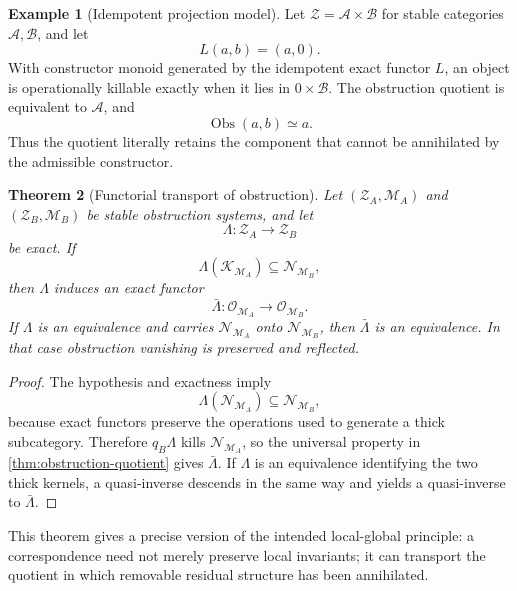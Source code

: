 \documentclass[11pt]{article}
\newtheorem{theorem}{Theorem}[section]
\theoremstyle{definition}
\newtheorem{example}[theorem]{Example}
\theoremstyle{remark}
\newcommand{\Obs}{\operatorname{Obs}}
\begin{document}
\begin{example}[Idempotent projection model]
Let $\mathcal Z=\mathcal A\times\mathcal B$ for stable categories $\mathcal A,\mathcal B$, and let
\[
L(a,b)=(a,0).
\]
With constructor monoid generated by the idempotent exact functor $L$, an object is operationally killable exactly when it lies in $0\times\mathcal B$. The obstruction quotient is equivalent to $\mathcal A$, and
\[
\Obs(a,b)\simeq a.
\]
Thus the quotient literally retains the component that cannot be annihilated by the admissible constructor.
\end{example}

\begin{theorem}[Functorial transport of obstruction]\label{thm:obstruction-transport}
Let $(\mathcal Z_A,\mathscr M_A)$ and $(\mathcal Z_B,\mathscr M_B)$ be stable obstruction systems, and let
\[
\Lambda:\mathcal Z_A\longrightarrow\mathcal Z_B
\]
be exact. If
\[
\Lambda(\mathcal K_{\mathscr M_A})\subseteq\mathcal N_{\mathscr M_B},
\]
then $\Lambda$ induces an exact functor
\[
\bar\Lambda:\mathcal O_{\mathscr M_A}\longrightarrow\mathcal O_{\mathscr M_B}.
\]
If $\Lambda$ is an equivalence and carries $\mathcal N_{\mathscr M_A}$ onto $\mathcal N_{\mathscr M_B}$, then $\bar\Lambda$ is an equivalence. In that case obstruction vanishing is preserved and reflected.
\end{theorem}

\begin{proof}
The hypothesis and exactness imply
\[
\Lambda(\mathcal N_{\mathscr M_A})\subseteq\mathcal N_{\mathscr M_B},
\]
because exact functors preserve the operations used to generate a thick subcategory. Therefore $q_B\Lambda$ kills $\mathcal N_{\mathscr M_A}$, so the universal property in \cref{thm:obstruction-quotient} gives $\bar\Lambda$. If $\Lambda$ is an equivalence identifying the two thick kernels, a quasi-inverse descends in the same way and yields a quasi-inverse to $\bar\Lambda$.
\end{proof}

This theorem gives a precise version of the intended local-global principle: a correspondence need not merely preserve local invariants; it can transport the quotient in which removable residual structure has been annihilated.
\end{document}
